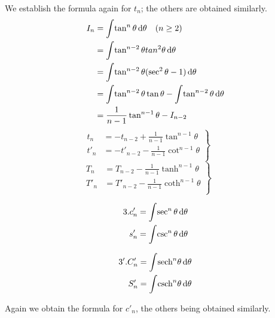 \documentclass[11pt]{amsbook}
\begin{document}
\quad We establish the formula again for  $t_{n}$; the others are obtained similarly.
\begin{align*}
	I_{n} &= \int \! \tan^n \theta \, \mathrm{d} \theta \quad (n \ge 2) \\	
	&= \int \! \tan^{n-2} \theta tan^2 \theta \, \mathrm{d} \theta \\
	&= \int \! \tan^{n-2} \theta (\sec^2 \theta -1) \, \mathrm{d} \theta  \\
	&= \int \! \tan^{n-2} \theta \tan \theta - \int \! \tan^{n-2} \theta \, \mathrm{d} \theta\\
	&= \frac{1}{n-1} \tan^{n-1} \theta - I_{n-2} \\
\end{align*}
\begin{equation*}
 \left.\begin{aligned}
          		t_{n} &= -t_{n-2} + \frac{1}{n-1} \tan^{n-1} \theta \\
		t'_{n} &= -t'_{n-2}- \frac{1}{n-1} \cot^{n-1} \theta \\
	\end{aligned}
	 \right\}
 \qquad \text{}
\end{equation*}
 \begin{equation*}
 \left.\begin{aligned}
      		 T_{n} &= T_{n-2} - \frac{1}{n-1} \tanh^{n-1} \theta \\
		T'_{n} &= T'_{n-2} - \frac{1}{n-1} \coth^{n-1} \theta \\
       \end{aligned}
 \right\}
 \qquad \text{}
\end{equation*}
\begin{multicols}{2}
	\begin{align*}
		3.   c'_{n} &= \int \! \sec^{n} \theta \, \mathrm{d} \theta  \\
 		 s'_{n} &= \int \! \csc^{n} \theta \, \mathrm{d} \theta 
	\end{align*}

	\begin{align*}
		3'.  C'_{n} &= \int \! \text{sech}^{n} \theta \, \mathrm{d} \theta  \\
		S'_{n} &= \int \! \text{csch}^{n} \theta \, \mathrm{d} \theta 
	\end{align*}
\end{multicols}
Again we obtain the formula for $ c'_{n}$, the others being obtained similarly.
\end{document}
